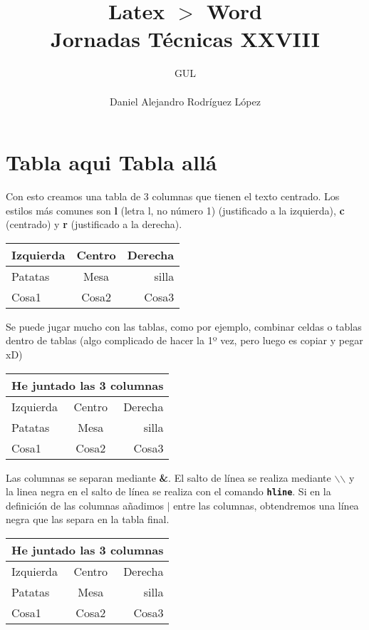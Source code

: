 \documentclass[10pt,a4paper,titlepage]{article} %
\title{ \textbf{ \Huge{Latex $>$ Word}} \\ Jornadas Técnicas XXVIII}
\author{
		\begin{tabular}{l}
			\multicolumn{1}{l}{GUL} \\ \hline \\
			Daniel Alejandro Rodríguez López \\
		\end{tabular}
}
\begin{document}
\maketitle
\newpage

\tableofcontents
\newpage

	\section{Tabla aqui Tabla allá}
	Con esto creamos una tabla de 3 columnas que tienen el texto centrado. Los estilos más comunes son \textbf{l} (letra l, no número 1) (justificado a la izquierda), \textbf{c} (centrado) y \textbf{r} (justificado a la derecha). 

	\begin{center}
		\begin{tabular}{l c r}
		Izquierda & Centro & Derecha \\ \hline
		Patatas & Mesa & silla \\
		Cosa1 & Cosa2 & Cosa3 \\ \hline
		\end{tabular}
	\end{center}


	Se puede jugar mucho con las tablas, como por ejemplo, combinar celdas o tablas dentro de tablas (algo complicado de hacer la 1º vez, pero luego es copiar y pegar xD)

	\begin{center}
		\begin{tabular}{l c r}
		\multicolumn{3}{c}{He juntado las 3 columnas} \\ \hline
		Izquierda & Centro & Derecha \\ \hline
		Patatas & Mesa & silla \\
		Cosa1 & Cosa2 & Cosa3 \\ \hline
		\end{tabular}
	\end{center}


	Las columnas se separan mediante \textbf{\&}. El salto de línea se realiza mediante \textbf{$\backslash$$\backslash$} y la linea negra en el salto de línea se realiza con el comando \textbf{\texttt{hline}}. Si en la definición de las columnas añadimos $|$ entre las columnas, obtendremos una línea negra que las separa en la tabla final.

	\begin{center}
		\begin{tabular}{l | c || r}
		\multicolumn{3}{c}{He juntado las 3 columnas} \\ \hline
		Izquierda & Centro & Derecha \\ \hline
		Patatas & Mesa & silla \\
		Cosa1 & Cosa2 & Cosa3 \\ \hline
		\end{tabular}
	\end{center}
\end{document}
